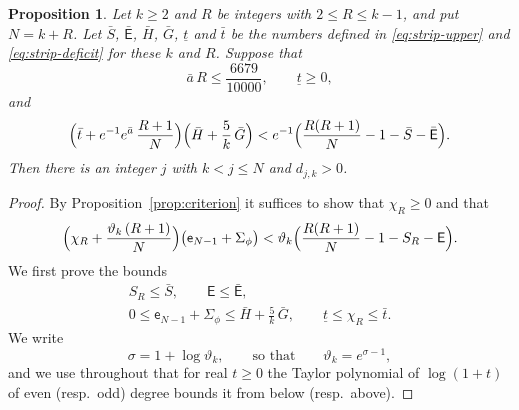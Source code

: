 \documentclass{amsart}
\newtheorem{proposition}[theorem]{Proposition}
\theoremstyle{definition}
\theoremstyle{remark}
\numberwithin{equation}{section}
\begin{document}
\begin{proposition}\label{prop:closedcriterion}
Let $k\ge 2$ and $R$ be integers with $2\le R\le k-1$, and put $N=k+R$. Let $\bar S$, $\bar{\mathsf E}$, $\bar H$, $\bar G$, $\underline t$ and $\bar t$ be the numbers defined in \eqref{eq:strip-upper} and \eqref{eq:strip-deficit} for these $k$ and $R$. Suppose that
\[
\bar a\,R\le\frac{6679}{10000},\qquad\underline t\ge 0,
\]
and
\begin{equation}\label{eq:strip-closed}
\Bigl(\bar t+e^{-1}e^{\bar a}\,\frac{R+1}{N}\Bigr)\Bigl(\bar H+\frac5k\,\bar G\Bigr)<e^{-1}\Bigl(\frac{R(R+1)}{N}-1-\bar S-\bar{\mathsf E}\Bigr).
\end{equation}
Then there is an integer $j$ with $k<j\le N$ and $d_{j,k}>0$.
\end{proposition}

\begin{proof}
By Proposition~\ref{prop:criterion} it suffices to show that $\chi_R\ge 0$ and that
\begin{equation}\label{eq:strip-criterion}
\Bigl(\chi_R+\frac{\vartheta_k\,(R+1)}{N}\Bigr)\bigl(\mathsf e_{N-1}+\Sigma_\phi\bigr)<\vartheta_k\Bigl(\frac{R(R+1)}{N}-1-S_R-\mathsf E\Bigr).
\end{equation}
We first prove the bounds
\begin{equation}\label{eq:strip-five}
\begin{gathered}
S_R\le\bar S,\qquad\mathsf E\le\bar{\mathsf E},\\
0\le\mathsf e_{N-1}+\Sigma_\phi\le\bar H+\frac5k\,\bar G,\qquad\underline t\le\chi_R\le\bar t.
\end{gathered}
\end{equation}
We write
\[
\sigma=1+\log\vartheta_k,\qquad\text{so that}\qquad\vartheta_k=e^{\sigma-1},
\]
and we use throughout that for real $t\ge 0$ the Taylor polynomial of $\log(1+t)$ of even (resp.\ odd) degree bounds it from below (resp.\ above).


\end{proof}
\end{document}
